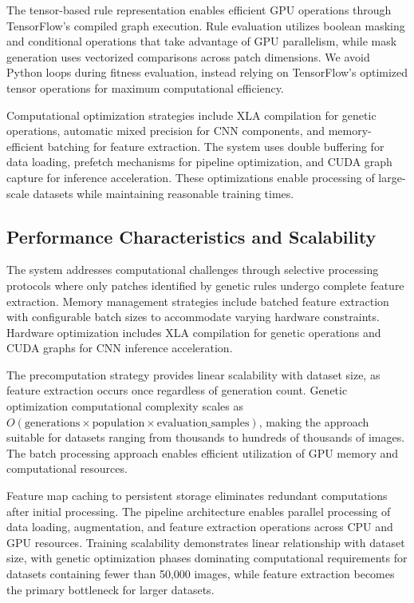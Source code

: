 \documentclass[runningheads]{llncs}
\begin{document}
The tensor-based rule representation enables efficient GPU operations through TensorFlow's compiled graph execution. Rule evaluation utilizes boolean masking and conditional operations that take advantage of GPU parallelism, while mask generation uses vectorized comparisons across patch dimensions. We avoid Python loops during fitness evaluation, instead relying on TensorFlow's optimized tensor operations for maximum computational efficiency.

Computational optimization strategies include XLA compilation for genetic operations, automatic mixed precision for CNN components, and memory-efficient batching for feature extraction. The system uses double buffering for data loading, prefetch mechanisms for pipeline optimization, and CUDA graph capture for inference acceleration. These optimizations enable processing of large-scale datasets while maintaining reasonable training times.

\subsection{Performance Characteristics and Scalability}
The system addresses computational challenges through selective processing protocols where only patches identified by genetic rules undergo complete feature extraction. Memory management strategies include batched feature extraction with configurable batch sizes to accommodate varying hardware constraints. Hardware optimization includes XLA compilation for genetic operations and CUDA graphs for CNN inference acceleration.

The precomputation strategy provides linear scalability with dataset size, as feature extraction occurs once regardless of generation count. Genetic optimization computational complexity scales as $O(\text{generations} \times \text{population} \times \text{evaluation\_samples})$, making the approach suitable for datasets ranging from thousands to hundreds of thousands of images. The batch processing approach enables efficient utilization of GPU memory and computational resources.

Feature map caching to persistent storage eliminates redundant computations after initial processing. The pipeline architecture enables parallel processing of data loading, augmentation, and feature extraction operations across CPU and GPU resources. Training scalability demonstrates linear relationship with dataset size, with genetic optimization phases dominating computational requirements for datasets containing fewer than 50,000 images, while feature extraction becomes the primary bottleneck for larger datasets.
\end{document}

